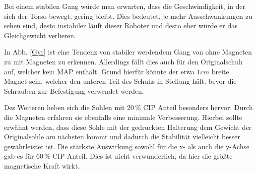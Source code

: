 
Bei einem stabilen Gang würde man erwarten, dass die Geschwindigkeit, in der sich der Torso bewegt, gering bleibt. Dies bedeutet, je mehr Ausschwankungen zu sehen sind, desto instabiler läuft dieser Roboter und desto eher würde er das Gleichgewicht verlieren. 

In Abb. \ref{Gyr} ist eine Tendenz von stabiler werdendem Gang von ohne Magneten zu mit Magneten zu erkennen. Allerdings fällt dies auch für den Originalschuh auf, welcher kein MAP enthält. Grund hierfür könnte der etwa $1\unit{cm}$ breite Magnet sein, welcher den unteren Teil des Schuhs in Stellung hält, bevor die Schrauben zur Befestigung verwendet werden.

Des Weiteren heben sich die Sohlen mit $20\,\%$ CIP Anteil besonders hervor. Durch die Magneten erfahren sie ebenfalls eine minimale Verbesserung. Hierbei sollte erwähnt werden, dass diese Sohle mit der gedruckten Halterung dem Gewicht der Originalsohle am nächsten kommt und dadurch die Stabilität vielleicht besser gewährleistet ist. Die stärkste Auswirkung sowohl für die x- als auch die y-Achse gab es für $60\,\%$ CIP Anteil. Dies ist nicht verwunderlich, da hier die größte magnetische Kraft wirkt. 

